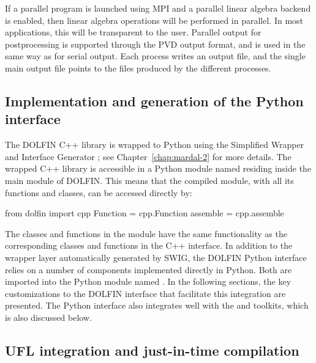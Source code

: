 If a parallel program is launched using MPI and a parallel linear
algebra backend is enabled, then linear algebra operations will be
performed in parallel. In most applications, this will be transparent
to the user.  Parallel output for postprocessing is supported through
the PVD output format, and is used in the same way as for serial
output. Each process writes an output file, and the single main output
file points to the files produced by the different processes.

\subsection{Implementation and generation of the Python interface}

The DOLFIN C++ library is wrapped to Python using the Simplified
Wrapper and Interface Generator \swig \citep{Beazley2006,www:swig};
see Chapter~\ref{chap:mardal-2} for more details. The wrapped C++
library is accessible in a Python module named  residing inside the
main  module of DOLFIN. This means that the compiled
module, with all its functions and classes, can be accessed directly
by:
\begin{python}
from dolfin import cpp
Function = cpp.Function
assemble = cpp.assemble
\end{python}
The classes and functions in the  module have the same
functionality as the corresponding classes and functions in the C++
interface. In addition to the wrapper layer automatically generated
by SWIG, the DOLFIN Python interface relies on a number of components
implemented directly in Python. Both are imported into the Python module
named . In the following sections, the key customizations to
the DOLFIN interface that facilitate this integration are presented. The
Python interface also integrates well with the \numpy and \scipy toolkits,
which is also discussed below.

\subsection{UFL integration and just-in-time compilation}


